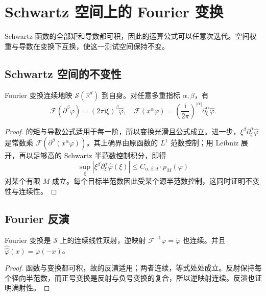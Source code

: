 \section{Schwartz 空间上的 Fourier 变换}
\label{b2:sec:0502}

Schwartz 函数的全部矩和导数都可积，因此的运算公式可以任意次迭代。空间权重与导数在变换下互换，使这一测试空间保持不变。

\subsection{Schwartz 空间的不变性}
\label{b2:subsec:050201}

\begin{theorem}\label{b2:thm:05-schwartz-invariance}
Fourier 变换连续地映 \(\mathcal S(\mathbb R^d)\) 到自身。对任意多重指标 \(\alpha,\beta\)，有
\[
 \mathcal F(\partial^\beta\varphi)=(2\pi\mathrm{i}\xi)^\beta\widehat\varphi,
 \quad
 \mathcal F(x^\alpha\varphi)=\left(\dfrac{\mathrm{i}}{2\pi}\right)^{|\alpha|}\partial_\xi^\alpha\widehat\varphi.
\]
\end{theorem}
\begin{proof}
的矩与导数公式适用于每一阶，所以变换光滑且公式成立。进一步，\(\xi^\beta\partial_\xi^\alpha\widehat\varphi\) 是常数乘 \(\mathcal F(\partial^\beta(x^\alpha\varphi))\)。其上确界由原函数的 \(L^1\) 范数控制；用 Leibniz 展开，再以足够高的 Schwartz 半范数控制积分，即得
\[
 \sup_\xi|\xi^\beta\partial_\xi^\alpha\widehat\varphi(\xi)|
 \leq C_{\alpha,\beta,d}\cdot p_M(\varphi)
\]
对某个有限 \(M\) 成立。每个目标半范数因此受某个源半范数控制，这同时证明不变性与连续性。
\end{proof}

\subsection{Fourier 反演}
\label{b2:subsec:050202}

\begin{corollary}\label{b2:cor:05-schwartz-automorphism}
Fourier 变换是 \(\mathcal S\) 上的连续线性双射，逆映射 \(\mathcal F^{-1}\varphi=\check\varphi\) 也连续。并且 \(\widehat{\widehat\varphi}(x)=\varphi(-x)\)。
\end{corollary}
\begin{proof}
函数与变换都可积，故的反演适用；两者连续，等式处处成立。反射保持每个径向半范数，而正号变换是反射与负号变换的复合，所以逆映射连续。反演也证明满射性。
\end{proof}

